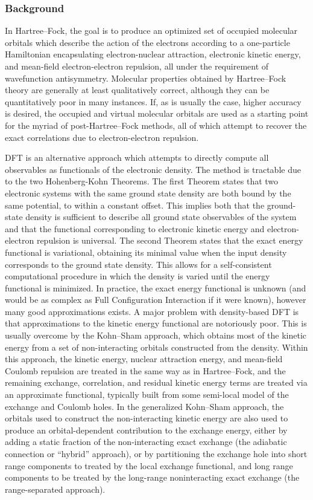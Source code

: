 \subsubsection{Background}

In Hartree--Fock, the goal is to produce an optimized set of occupied molecular
orbitals which describe the action of the electrons according to a one-particle
Hamiltonian encapsulating electron-nuclear attraction, electronic kinetic
energy, and mean-field electron-electron repulsion, all under the requirement of
wavefunction antisymmetry. Molecular properties obtained by Hartree--Fock theory
are generally at least qualitatively correct, although they can be
quantitatively poor in many instances. If, as is usually the case, higher
accuracy is desired, the occupied and virtual molecular orbitals are used as a
starting point for the myriad of post-Hartree--Fock methods, all of which attempt
to recover the exact correlations due to electron-electron repulsion.  

DFT is an alternative approach which attempts to directly compute all
observables as functionals of the electronic density. The method is tractable
due to the two Hohenberg-Kohn Theorems. The first Theorem states that two
electronic systems with the same ground state density are both bound by the same
potential, to within a constant offset. This implies both that the ground-state
density is sufficient to describe all ground state observables of the system and
that the functional corresponding to electronic kinetic energy and
electron-electron repulsion is universal. The second Theorem states that the
exact energy functional is variational, obtaining its minimal value when the
input density corresponds to the ground state density. This allows for a
self-consistent computational procedure in which the density is varied until the
energy functional is minimized. In practice, the exact energy functional is
unknown (and would be as complex as Full Configuration Interaction if it were
known), however many good approximations exists. A major problem with
density-based DFT is that approximations to the kinetic energy functional are
notoriously poor. This is usually overcome by the Kohn--Sham approach, which
obtains most of the kinetic energy from a set of non-interacting orbitals
constructed from the density. Within this approach, the kinetic energy,
nuclear attraction energy, and mean-field Coulomb repulsion are treated in the
same way as in Hartree--Fock, and the remaining exchange, correlation, and
residual kinetic energy terms are treated via an approximate functional,
typically built from some semi-local model of the exchange and Coulomb holes. In
the generalized Kohn--Sham approach, the orbitals used to construct the
non-interacting kinetic energy are also used to produce an orbital-dependent
contribution to the exchange energy, either by adding a static fraction of the
non-interacting exact exchange (the adiabatic connection or ``hybrid''
approach), or by partitioning the exchange hole into short range components to
treated by the local exchange functional, and long range components to be
treated by the long-range noninteracting exact exchange (the range-separated
approach).

